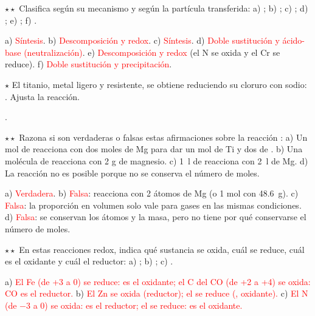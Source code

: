 \begin{exercise}
    \(\star\star\) Clasifica según su mecanismo y según la partícula transferida: a) ;
    b) ; c) ; d) ;
    e) ; f) .
    \begin{solu}
        a) \textcolor{red}{Síntesis}. b) \textcolor{red}{Descomposición y redox}. c) \textcolor{red}{Síntesis}. d)
        \textcolor{red}{Doble sustitución y ácido-base (neutralización)}. e) \textcolor{red}{Descomposición y redox} (el N se oxida
        y el Cr se reduce). f) \textcolor{red}{Doble sustitución y precipitación}.
    \end{solu}
\end{exercise}

\begin{exercise}
    \(\star\) El titanio, metal ligero y resistente, se obtiene reduciendo su cloruro con sodio:
    . Ajusta la reacción.
    \begin{solu}
        \textcolor{red}{}.
    \end{solu}
\end{exercise}

\begin{exercise}
    \(\star\star\) Razona si son verdaderas o falsas estas afirmaciones sobre la reacción :
    a) Un mol de  reacciona con dos moles de Mg para dar un mol de Ti y dos de . b) Una molécula de 
    reacciona con 2 g de magnesio. c) \qty{1}{\litre} de  reacciona con \qty{2}{\litre} de Mg. d) La reacción no es
    posible porque no se conserva el número de moles.
    \begin{solu}
        a) \textcolor{red}{Verdadera}. b) \textcolor{red}{Falsa}: reacciona con 2 átomos de Mg (o 1 mol con \qty{48.6}{\gram}).
        c) \textcolor{red}{Falsa}: la proporción en volumen solo vale para gases en las mismas condiciones. d) \textcolor{red}{Falsa}:
        se conservan los átomos y la masa, pero no tiene por qué conservarse el número de moles.
    \end{solu}
\end{exercise}

\begin{exercise}
    \(\star\star\) En estas reacciones redox, indica qué sustancia se oxida, cuál se reduce, cuál es el oxidante y cuál el
    reductor: a) ; b) ; c) .
    \begin{solu}
        a) \textcolor{red}{El Fe (de +3 a 0) se reduce:  es el oxidante; el C del CO (de +2 a +4) se oxida: CO es el
        reductor.} b) \textcolor{red}{El Zn se oxida (reductor); el  se reduce (, oxidante).} c)
        \textcolor{red}{El N (de \(-\)3 a 0) se oxida:  es el reductor; el  se reduce: es el oxidante.}
    \end{solu}
\end{exercise}

